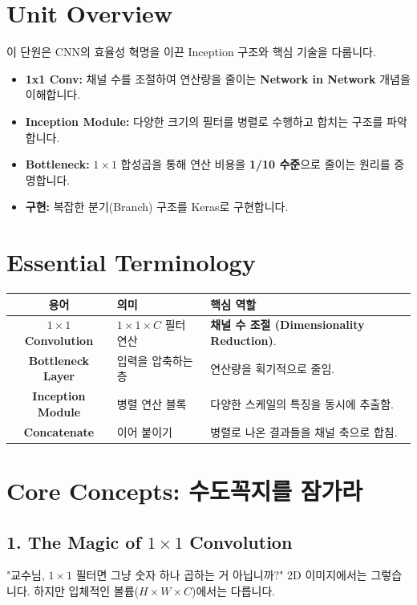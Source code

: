 \documentclass[11pt,a4paper]{book}
\theoremstyle{definition}
\begin{document}
\section{Unit Overview}
\begin{summarybox}[title={핵심 목표}]
이 단원은 CNN의 효율성 혁명을 이끈 Inception 구조와 핵심 기술을 다룹니다.
\begin{itemize}
    \item \textbf{1x1 Conv:} 채널 수를 조절하여 연산량을 줄이는 \textbf{Network in Network} 개념을 이해합니다.
    \item \textbf{Inception Module:} 다양한 크기의 필터를 병렬로 수행하고 합치는 구조를 파악합니다.
    \item \textbf{Bottleneck:} $1 \times 1$ 합성곱을 통해 연산 비용을 \textbf{1/10 수준}으로 줄이는 원리를 증명합니다.
    \item \textbf{구현:} 복잡한 분기(Branch) 구조를 Keras로 구현합니다.
\end{itemize}
\end{summarybox}

\section{Essential Terminology}
\begin{center}
\begin{tabular}{|c|l|l|}
\hline
\textbf{용어} & \textbf{의미} & \textbf{핵심 역할} \\ \hline
\textbf{$1 \times 1$ Convolution} & $1 \times 1 \times C$ 필터 연산 & \textbf{채널 수 조절 (Dimensionality Reduction)}. \\ \hline
\textbf{Bottleneck Layer} & 입력을 압축하는 층 & 연산량을 획기적으로 줄임. \\ \hline
\textbf{Inception Module} & 병렬 연산 블록 & 다양한 스케일의 특징을 동시에 추출함. \\ \hline
\textbf{Concatenate} & 이어 붙이기 & 병렬로 나온 결과들을 채널 축으로 합침. \\ \hline
\end{tabular}
\end{center}

\section{Core Concepts: 수도꼭지를 잠가라}

\subsection{1. The Magic of $1 \times 1$ Convolution}
"교수님, $1 \times 1$ 필터면 그냥 숫자 하나 곱하는 거 아닙니까?"
2D 이미지에서는 그렇습니다. 하지만 입체적인 볼륨($H \times W \times C$)에서는 다릅니다.
\end{document}
